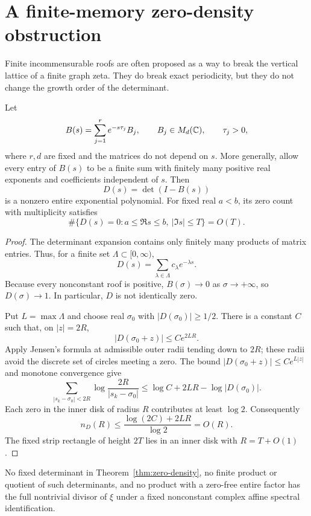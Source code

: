 \section{A finite-memory zero-density obstruction}
\label{sec:zero-density}

Finite incommensurable roofs are often proposed as a way to break the
vertical lattice of a finite graph zeta. They do break exact periodicity, but
they do not change the growth order of the determinant.

\begin{theorem}
\label{thm:zero-density}
Let
\[
B(s)=\sum_{j=1}^{r}e^{-s\tau_j}B_j,
\qquad
B_j\in M_d(\mathbb{C}),\qquad \tau_j>0,
\]
where \(r,d\) are fixed and the matrices do not depend on \(s\). More
generally, allow every entry of \(B(s)\) to be a finite sum with finitely many
positive real exponents and coefficients independent of \(s\). Then
\[
D(s)=\det(I-B(s))
\]
is a nonzero entire exponential polynomial. For fixed real \(a<b\), its
zero count with multiplicity satisfies
\[
\#\{D(s)=0:a\le\Re s\le b,\ |\Im s|\le T\}=O(T).
\]
\end{theorem}

\begin{proof}
The determinant expansion contains only finitely many products of matrix
entries. Thus, for a finite set \(\Lambda\subset[0,\infty)\),
\[
D(s)=\sum_{\lambda\in\Lambda}c_\lambda e^{-\lambda s}.
\]
Because every nonconstant roof is positive, \(B(\sigma)\to0\) as
\(\sigma\to+\infty\), so \(D(\sigma)\to1\). In particular, \(D\) is not
identically zero.

Put \(L=\max\Lambda\) and choose real \(\sigma_0\) with
\(|D(\sigma_0)|\ge1/2\). There is a constant \(C\) such that, on
\(|z|=2R\),
\[
|D(\sigma_0+z)|\le C e^{2LR}.
\]
Apply Jensen's formula at admissible outer radii tending down to \(2R\);
these radii avoid the discrete set of circles meeting a zero. The bound
\(|D(\sigma_0+z)|\le Ce^{L|z|}\) and monotone convergence give
\[
\sum_{|s_k-\sigma_0|<2R}
\log\frac{2R}{|s_k-\sigma_0|}
\le \log C+2LR-\log|D(\sigma_0)|.
\]
Each zero in the inner disk of radius \(R\) contributes at least \(\log2\).
Consequently
\[
n_D(R)\le
\frac{\log(2C)+2LR}{\log2}=O(R).
\]
The fixed strip rectangle of height \(2T\) lies in an inner disk with
\(R=T+O(1)\).
\end{proof}

\begin{corollary}
\label{cor:rvm}
No fixed determinant in Theorem~\ref{thm:zero-density}, no finite product or
quotient of such determinants, and no product with a zero-free entire factor
has the full nontrivial divisor of \(\xi\) under a fixed nonconstant complex
affine spectral identification.
\end{corollary}

